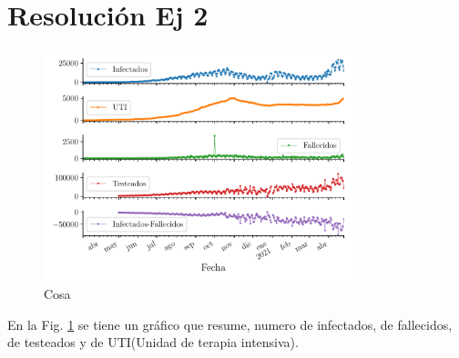 \documentclass[twocolumn,aps,prl]{revtex4-1}
\begin{document}
\section{Resolución Ej 2}

\begin{figure}[!ht]
  \centering
    \includegraphics[width = 0.8\textwidth]{figuras/ex02-resumen.pdf}
    \caption{Cosa}
    \label{fig:ex02Resumen}
\end{figure}

En la Fig. \ref{fig:ex02Resumen} se tiene un gráfico que resume, numero de infectados, de fallecidos, de testeados y de UTI(Unidad de terapia intensiva).
\end{document}

